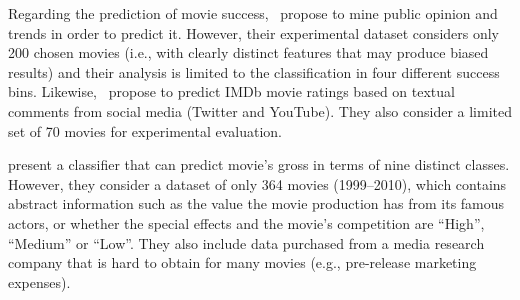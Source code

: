 Regarding the prediction of movie success,~\cite{KimKHC13} propose to mine
public opinion and trends in order to predict it. However, their experimental
dataset considers only 200 chosen movies (i.e., with clearly distinct features
that may produce biased results) and their analysis is limited to the
classification in four different success bins. Likewise,~\cite{OghinaBTR2012}
propose to predict IMDb movie ratings based on textual comments from social
media (Twitter and YouTube). They also consider a limited set of 70 movies for
experimental evaluation.

\cite{Ghiassi2015} present a classifier that can predict movie's gross in
terms of nine distinct classes.  However, they consider a dataset of only 364
movies (1999--2010), which contains abstract information such as the value the
movie production has from its famous actors, or whether the special effects and
the movie's competition are ``High'', ``Medium'' or ``Low''. They also include
data purchased from a media research company that is hard to obtain for many
movies (e.g., pre-release marketing expenses).
